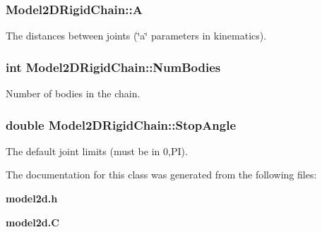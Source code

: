 \subsubsection{ Model2DRigid\-Chain::A}\label{classModel2DRigidChain_m1}


The distances between joints (\char`\"{}a\char`\"{} parameters in kinematics).

\subsubsection{\setlength{\rightskip}{0pt plus 5cm}int Model2DRigid\-Chain::Num\-Bodies}\label{classModel2DRigidChain_m0}


Number of bodies in the chain.

\subsubsection{\setlength{\rightskip}{0pt plus 5cm}double Model2DRigid\-Chain::Stop\-Angle}\label{classModel2DRigidChain_m2}


The default joint limits (must be in 0,PI).



The documentation for this class was generated from the following files:\begin{CompactItemize}
\item 
{\bf model2d.h}\item 
{\bf model2d.C}\end{CompactItemize}
